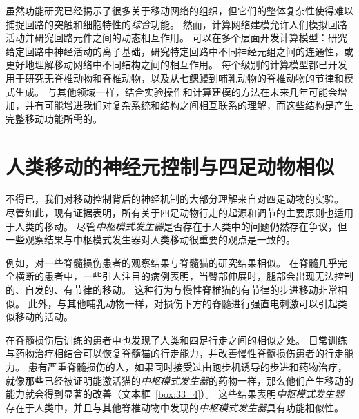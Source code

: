 虽然功能研究已经揭示了很多关于移动网络的组织，但它们的整体复杂性使得难以捕捉回路的突触和细胞特性的\textit{综合}功能。
然而，计算网络建模允许人们模拟回路活动并研究回路元件之间的动态相互作用。
可以在多个层面开发计算模型：研究给定回路中神经活动的离子基础，研究特定回路中不同神经元组之间的连通性，或更好地理解移动网络中不同结构之间的相互作用。
每个级别的计算模型都已开发用于研究无脊椎动物和脊椎动物，以及从七鳃鳗到哺乳动物的脊椎动物的节律和模式生成。
与其他领域一样，结合实验操作和计算建模的方法在未来几年可能会增加，并有可能增进我们对复杂系统和结构之间相互联系的理解，而这些结构是产生完整移动功能所需的。


\section{人类移动的神经元控制与四足动物相似}

不得已，我们对移动控制背后的神经机制的大部分理解来自对四足动物的实验。
尽管如此，现有证据表明，所有关于四足动物行走的起源和调节的主要原则也适用于人类的移动。
尽管\textit{中枢模式发生器}是否存在于人类中的问题仍然存在争议，但一些观察结果与中枢模式发生器对人类移动很重要的观点是一致的。


例如，对一些脊髓损伤患者的观察结果与脊髓猫的研究结果相似。
在脊髓几乎完全横断的患者中，一些引人注目的病例表明，当臀部伸展时，腿部会出现无法控制的、自发的、有节律的移动。
这种行为与慢性脊椎猫的有节律的步进移动非常相似。
此外，与其他哺乳动物一样，对损伤下方的脊髓进行强直电刺激可以引起类似移动的活动。


在脊髓损伤后训练的患者中也发现了人类和四足行走之间的相似之处。
日常训练与药物治疗相结合可以恢复脊髓猫的行走能力，并改善慢性脊髓损伤患者的行走能力。
患有严重脊髓损伤的人，如果同时接受过由跑步机诱导的步进和药物治疗，就像那些已经被证明能激活猫的\textit{中枢模式发生器}的药物一样，那么他们产生移动的能力就会得到显著的改善（文本框~\ref{box:33_4}）。
这些结果表明\textit{中枢模式发生器}存在于人类中，并且与其他脊椎动物中发现的\textit{中枢模式发生器}具有功能相似性。




